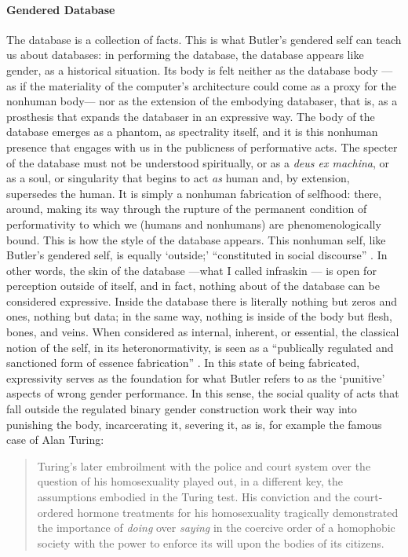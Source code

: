 \paragraph{Gendered Database}
The database is a collection of facts. This is what Butler's gendered self can teach us about databases: in performing the database, the database appears like gender, as a historical situation. Its body is felt neither as the database body ---as if the materiality of the computer's architecture could come as a proxy for the nonhuman body--- nor as the extension of the embodying databaser, that is, as a prosthesis that expands the databaser in an expressive way. The body of the database emerges as a phantom, as spectrality itself, and it is this nonhuman presence that engages with us in the publicness of performative acts. The specter of the database must not be understood spiritually, or as a \textit{deus ex machina}, or as a soul, or singularity that begins to act \textit{as} human and, by extension, supersedes the human. It is simply a nonhuman fabrication of selfhood: there, around, making its way through the rupture of the permanent condition of performativity to which we (humans and nonhumans) are phenomenologically bound. This is how the style of the database appears. This nonhuman self, like Butler's gendered self, is equally `outside;' ``constituted in social discourse'' \parencite[528]{But88:Per}. In other words, the skin of the database ---what I called infraskin --- is open for perception outside of itself, and in fact, nothing about of the database can be considered expressive. Inside the database there is literally nothing but zeros and ones, nothing but data; in the same way, nothing is inside of the body but flesh, bones, and veins. When considered as internal, inherent, or essential, the classical notion of the self, in its heteronormativity, is seen as a ``publically regulated and sanctioned form of essence fabrication'' \parencite[528]{But88:Per}. In this state of being fabricated, expressivity serves as the foundation for what Butler refers to as the `punitive' aspects of wrong gender performance. In this sense, the social quality of acts that fall outside the regulated binary gender construction work their way into punishing the body, incarcerating it, severing it, as is, for example the famous case of Alan Turing:

\begin{quote}
	Turing's later embroilment with the police and court system over the question of his homosexuality played out, in a different key, the assumptions embodied in the Turing test. His conviction and the court-ordered hormone treatments for his homosexuality tragically demonstrated the importance of \textit{doing} over \textit{saying} in the coercive order of a homophobic society with the power to enforce its will upon the bodies of its citizens. \parencite[xii]{Hay99:How}
\end{quote}
